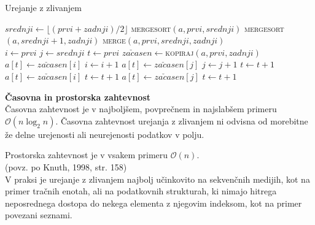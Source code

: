 \documentclass[a4paper,oneside,12pt]{article}
\newcommand{\subsubsubsection}[1]{\vspace*{1ex}\textbf{#1}\\}
\begin{document}
\begin{algorithm}[h!t!]
  \caption{Urejanje z zlivanjem}\label{algo:mergesort}
  \begin{algorithmic}[1]
         \Return \EndIf
        \State $srednji \gets \lfloor(prvi + zadnji) / 2\rfloor$
        \State \textsc{mergesort}$(a, prvi, srednji)$
        \State \textsc{mergesort}$(a, srednji + 1, zadnji)$
        \State \textsc{merge}$(a, prvi, srednji, zadnji)$
    \EndFunction
    \\
        \State $i \gets prvi$
        \State $j \gets srednji$
        \State $t \gets prvi$
        \State $za\check{c}asen \gets$\textsc{kopiraj}$(a, prvi, zadnji)$ 
                \State $a[t] \gets za\check{c}asen[i]$
                \State $i \gets i + 1$
            \Else
                \State $a[t] \gets za\check{c}asen[j]$
                \State $j \gets j + 1$
            \EndIf
            \State $t \gets t + 1$
        \EndWhile
            \State $a[t] \gets za\check{c}asen[i]$
            \State $t \gets t + 1$
        \EndWhile
            \State $a[t] \gets za\check{c}asen[j]$
            \State $t \gets t + 1$
        \EndWhile
    \EndFunction
  \end{algorithmic}
\end{algorithm}

\subsubsubsection{Časovna in prostorska zahtevnost} \nopagebreak
Časovna zahtevnost je v najboljšem, povprečnem in najslabšem primeru 
$\mathcal{O}(n\log_2 n)$. Časovna zahtevnost urejanja z zlivanjem ni odvisna od
morebitne že delne urejenosti ali neurejenosti podatkov v polju. 

Prostorska zahtevnost je v vsakem primeru $\mathcal{O}(n)$.\\ %
(povz. po Knuth, 1998, str. 158) \\

V praksi je urejanje z zlivanjem najbolj učinkovito na
sekvenčnih medijih, kot na primer tračnih enotah, ali na podatkovnih strukturah, ki nimajo hitrega
neposrednega dostopa do nekega elementa z njegovim indeksom, kot na primer povezani seznami.
\end{document}
